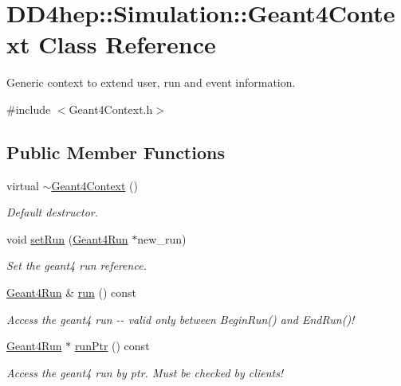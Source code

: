 \hypertarget{class_d_d4hep_1_1_simulation_1_1_geant4_context}{
\section{DD4hep::Simulation::Geant4Context Class Reference}
\label{class_d_d4hep_1_1_simulation_1_1_geant4_context}
}


Generic context to extend user, run and event information.  


{\ttfamily \#include $<$Geant4Context.h$>$}\subsection*{Public Member Functions}
\begin{DoxyCompactItemize}
\item 
virtual \hyperlink{class_d_d4hep_1_1_simulation_1_1_geant4_context_a2749e0729fa01575c3bac14918cca3c8}{$\sim$Geant4Context} ()
\begin{DoxyCompactList}\small\item\em Default destructor. \item\end{DoxyCompactList}\item 
void \hyperlink{class_d_d4hep_1_1_simulation_1_1_geant4_context_a31bdc70c285a758ad7563d5c54a5072a}{setRun} (\hyperlink{class_d_d4hep_1_1_simulation_1_1_geant4_run}{Geant4Run} $\ast$new\_\-run)
\begin{DoxyCompactList}\small\item\em Set the geant4 run reference. \item\end{DoxyCompactList}\item 
\hyperlink{class_d_d4hep_1_1_simulation_1_1_geant4_run}{Geant4Run} \& \hyperlink{class_d_d4hep_1_1_simulation_1_1_geant4_context_a5bdead358308c241c59b7fa5f68a2b16}{run} () const 
\begin{DoxyCompactList}\small\item\em Access the geant4 run -\/-\/ valid only between BeginRun() and EndRun()! \item\end{DoxyCompactList}\item 
\hyperlink{class_d_d4hep_1_1_simulation_1_1_geant4_run}{Geant4Run} $\ast$ \hyperlink{class_d_d4hep_1_1_simulation_1_1_geant4_context_a05ad84f9bc8f1f3dc8ab22416b002529}{runPtr} () const 
\begin{DoxyCompactList}\small\item\em Access the geant4 run by ptr. Must be checked by clients! \item\end{DoxyCompactList}\item 

\end{DoxyCompactItemize}
